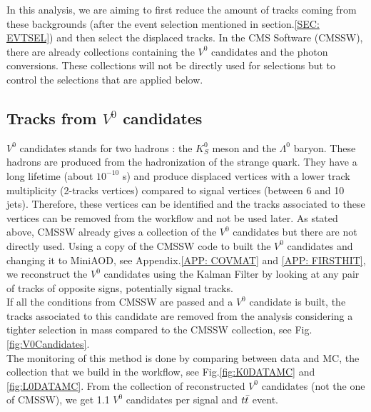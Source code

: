 \documentclass{cernatlasnote}
\begin{document}
    In this analysis, we are aiming to first reduce the amount of tracks coming from these backgrounds (after the event selection mentioned in section.\ref{SEC: EVTSEL}) and then select the displaced tracks. In the CMS Software (CMSSW), there are already collections containing the $V^0$ candidates and the photon conversions. These collections will not be directly used for selections but to control the selections that are applied below.

    
    \subsection{Tracks from $V^0$ candidates}
        $V^0$ candidates stands for two hadrons : the $K^0_S$ meson and the $\Lambda^{0}$ baryon. These hadrons are produced from the hadronization of the strange quark. They have a long lifetime (about $10^{-10}$ s) and produce  displaced vertices with a lower track multiplicity (2-tracks vertices) compared to signal vertices (between 6 and 10 jets). Therefore, these vertices can be identified and the tracks associated to these vertices can be removed from the workflow and not be used later.
         As stated above, CMSSW already gives a collection of the $V^0$ candidates \cite{V0CAND} but there are not directly used. Using a copy of the CMSSW code to built the $V^0$ candidates and changing it to MiniAOD, see Appendix.\ref{APP: COVMAT} and \ref{APP: FIRSTHIT}, we reconstruct the  $V^0$ candidates using the Kalman Filter \cite{KVF} by looking at any pair of tracks of opposite signs, potentially signal tracks.\\
        If all the conditions from CMSSW are passed and a $V^0$ candidate is built, the tracks associated to this candidate are removed from the analysis considering a tighter selection in mass compared to the CMSSW collection, see Fig.\ref{fig:V0Candidates}.\\

        The monitoring of this method is done by comparing between data and MC, the collection that we build in the workflow, see Fig.\ref{fig:K0DATAMC} and \ref{fig:L0DATAMC}. From the collection of reconstructed $V^0$ candidates (not the one of CMSSW), we get 1.1 $V^0$ candidates per signal and $t\Bar{t}$ event.
\end{document}
